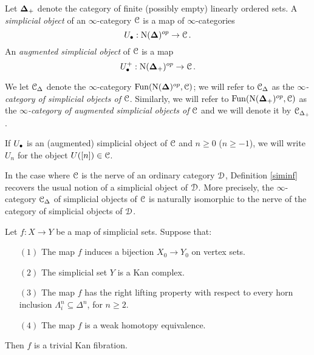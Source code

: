 \begin{definition}\label{siminf}
Let $\operatorname{{\bf \Delta}}_{+}$ denote the category of finite (possibly empty) linearly ordered sets.
A {\it simplicial object} of an $\infty$-category $\operatorname{\mathcal{C}}$ is a map of $\infty$-categories
$$U_{\bullet}: \operatorname{N}(\operatorname{{\bf \Delta}})^{op} \rightarrow \operatorname{\mathcal{C}}.$$
An {\it augmented simplicial object} of $\operatorname{\mathcal{C}}$ is a map
$$U_{\bullet}^{+}: \operatorname{N}(\operatorname{{\bf \Delta}}_{+})^{op} \rightarrow \operatorname{\mathcal{C}}.$$

We let $\operatorname{\mathcal{C}}_{\Delta}$ denote the $\infty$-category $\operatorname{Fun}( \operatorname{N}(\operatorname{{\bf \Delta}})^{op}, \operatorname{\mathcal{C}})$; we will refer
to $\operatorname{\mathcal{C}}_{\Delta}$ as the {\it $\infty$-category of simplicial objects of $\operatorname{\mathcal{C}}$}. Similarly, we 
will refer to $\operatorname{Fun}(\operatorname{N}(\operatorname{{\bf \Delta}}_{+})^{op}, \operatorname{\mathcal{C}})$ 
as the {\it $\infty$-category of augmented simplicial objects of $\operatorname{\mathcal{C}}$} and we will denote it by $\operatorname{\mathcal{C}}_{\Delta_{+}}$.

If $U_{\bullet}$ is an (augmented) simplicial object of $\operatorname{\mathcal{C}}$ and $n \geq 0$ ($n \geq -1$), we will write $U_{n}$ for the object $U([n]) \in \operatorname{\mathcal{C}}$. 
\end{definition}

\begin{remark}
In the case where $\operatorname{\mathcal{C}}$ is the nerve of an ordinary category $\operatorname{\mathcal{D}}$, Definition \ref{siminf} recovers the usual notion of a simplicial object of $\operatorname{\mathcal{D}}$. More precisely, the $\infty$-category $\operatorname{\mathcal{C}}_{\Delta}$ of simplicial objects of $\operatorname{\mathcal{C}}$ is naturally isomorphic to the nerve of the category of simplicial objects of $\operatorname{\mathcal{D}}$.
\end{remark}

\begin{lemma}\label{silling}
Let $f: X \rightarrow Y$ be a map of simplicial sets. Suppose that:

\begin{itemize}
\item[$(1)$] The map $f$ induces a bijection $X_0 \rightarrow Y_0$ on vertex sets.
\item[$(2)$] The simplicial set $Y$ is a Kan complex.
\item[$(3)$] The map $f$ has the right lifting property with respect to every horn inclusion
$\Lambda^n_i \subseteq \Delta^n$, for $n \geq 2$.
\item[$(4)$] The map $f$ is a weak homotopy equivalence.
\end{itemize}

Then $f$ is a trivial Kan fibration.
\end{lemma}


